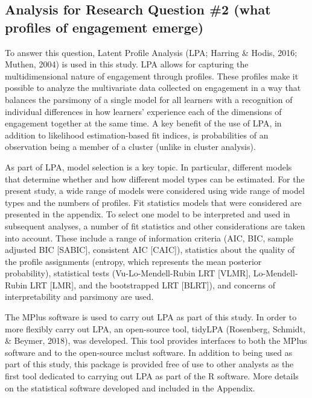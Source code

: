 \documentclass[]{msu-thesis}
\theoremstyle{definition}
\theoremstyle{definition}
\theoremstyle{definition}
\theoremstyle{remark}
\begin{document}
\subsection{Analysis for Research Question \#2 (what profiles of
engagement
emerge)}\label{analysis-for-research-question-2-what-profiles-of-engagement-emerge}

To answer this question, Latent Profile Analysis (LPA; Harring \& Hodis,
2016; Muthen, 2004) is used in this study. LPA allows for capturing the
multidimensional nature of engagement through profiles. These profiles
make it possible to analyze the multivariate data collected on
engagement in a way that balances the parsimony of a single model for
all learners with a recognition of individual differences in how
learners' experience each of the dimensions of engagement together at
the same time. A key benefit of the use of LPA, in addition to
likelihood estimation-based fit indices, is probabilities of an
observation being a member of a cluster (unlike in cluster analysis).

As part of LPA, model selection is a key topic. In particular, different
models that determine whether and how different model types can be
estimated. For the present study, a wide range of models were considered
using wide range of model types and the numbers of profiles. Fit
statistics models that were considered are presented in the appendix. To
select one model to be interpreted and used in subsequent analyses, a
number of fit statistics and other considerations are taken into
account. These include a range of information criteria (AIC, BIC, sample
adjusted BIC {[}SABIC{]}, consistent AIC {[}CAIC{]}), statistics about
the quality of the profile assignments (entropy, which represents the
mean posterior probability), statistical tests (Vu-Lo-Mendell-Rubin LRT
{[}VLMR{]}, Lo-Mendell-Rubin LRT {[}LMR{]}, and the bootstrapped LRT
{[}BLRT{]}), and concerns of interpretability and parsimony are used.

The MPlus software is used to carry out LPA as part of this study. In
order to more flexibly carry out LPA, an open-source tool, tidyLPA
(Rosenberg, Schmidt, \& Beymer, 2018), was developed. This tool provides
interfaces to both the MPlus software and to the open-source mclust
software. In addition to being used as part of this study, this package
is provided free of use to other analysts as the first tool dedicated to
carrying out LPA as part of the R software. More details on the
statistical software developed and included in the Appendix.
\end{document}
